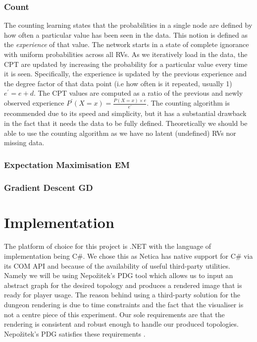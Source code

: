 \documentclass{UoYCSproject}
\begin{document}
\subsubsection{Count \parencite[48-50]{neticaCman}}
The counting learning states that the probabilities in a single node are defined by how often a particular value has been seen in the data. This notion is defined as the \textit{experience} of that value. The network starts in a state of complete ignorance with uniform probabilities across all RVs. As we iteratively load in the data, the CPT are updated by increasing the probability for a particular value every time it is seen. Specifically, the experience is updated by the previous experience and the degree factor of that data point (i.e how often is it repeated, usually 1) \(e^{\prime} = e + d\). The CPT values are computed as a ratio of the previous and newly observed experience \(P^{\prime}(X=x) = \frac{P(X=x) \times e}{e^{\prime}}\). The counting algorithm is recommended due to its speed and simplicity, but it has a substantial drawback in the fact that it needs the data to be fully defined. Theoretically we should be able to use the counting algorithm as we have no latent (undefined) RVs nor missing data.

\subsubsection{Expectation Maximisation EM} %
\subsubsection{Gradient Descent GD}

\section{Implementation}
\paragraph{}
The platform of choice for this project is .NET with the language of implementation being C\#. We chose this as Netica has native support for C\# via its COM API and because of the availability of useful third-party utilities. Namely we will be using Nepo\v{z}itek's PDG tool \parencite{levelGenerator} which allows us to input an abstract graph for the desired topology and produces a rendered image that is ready for player usage. The reason behind using a third-party solution for the dungeon rendering is due to time constraints and the fact that the visualiser is not a centre piece of this experiment. Our sole requirements are that the rendering is consistent and robust enough to handle our produced topologies. Nepo\v{z}itek's PDG satisfies these requirements \parencite{Nepozitek2018FASTCT}.
\label{sec:implementation} %
\end{document}
